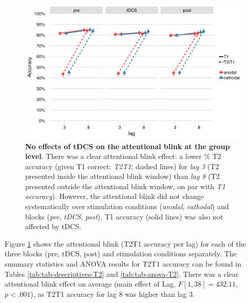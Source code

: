 \documentclass[11pt,english,]{memoir}
\begin{document}
\begin{figure}
\includegraphics[width=130mm]{AB_tDCS_files/figures/figure_3_group} \caption{\textbf{No effects of tDCS on the attentional blink at the group level}. There was a clear attentional blink effect: a lower \% T2 accuracy (given T1 correct: \emph{T2\textbar{}T1}; dashed lines) for \emph{lag 3} (T2 presented inside the attentional blink window) than \emph{lag 8} (T2 presented outside the attentional blink window, on par with \emph{T1 accuracy}). However, the attentional blink did not change systematically over stimulation conditions (\emph{anodal}, \emph{cathodal}) and blocks (\emph{pre}, \emph{tDCS}, \emph{post}). T1 accuracy (solid lines) was also not affected by tDCS.}\label{fig:fig-group}
\end{figure}



Figure \ref{fig:fig-group} shows the attentional blink (T2\textbar{}T1 accuracy per lag) for each of the three blocks (pre, tDCS, post) and stimulation conditions separately. The summary statistics and ANOVA results for T2\textbar{}T1 accuracy can be found in Tables \ref{tab:tab-descriptives-T2} and \ref{tab:tab-anova-T2}. There was a clear attentional blink effect on average (main effect of Lag, \(F[1, 38] = 432.11\), \(p < .001\)), as T2\textbar{}T1 accuracy for lag 8 was higher than lag 3.
\end{document}
